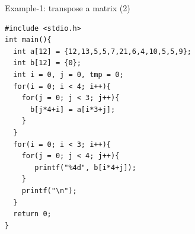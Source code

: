 \begin{frame}[fragile]{Example-1: transpose a matrix (2)}
\begin{lstlisting}[xleftmargin=0.08\linewidth, linewidth=0.85\linewidth]
#include <stdio.h>
int main(){
  int a[12] = {12,13,5,5,7,21,6,4,10,5,5,9};
  int b[12] = {0};
  int i = 0, j = 0, tmp = 0;
  for(i = 0; i < 4; i++){
    for(j = 0; j < 3; j++){
      b[j*4+i] = a[i*3+j];
    }
  }
  for(i = 0; i < 3; i++){
    for(j = 0; j < 4; j++){
       printf("%4d", b[i*4+j]);
    }
    printf("\n");
  }
  return 0;
}
\end{lstlisting}
\end{frame}
